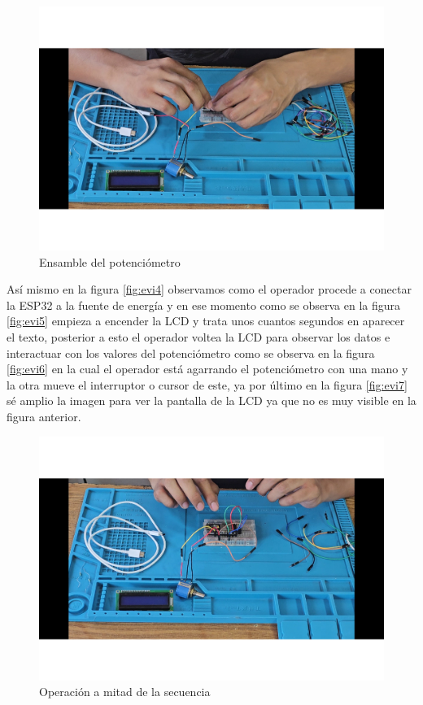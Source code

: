     \begin{figure}[H]
        \centering
        \includegraphics[trim = {25mm 25mm 25mm 10mm},clip,scale=0.3]{22/Img/e2.pdf}
        \caption{Ensamble del potenciómetro}
        \label{fig:evi1}
    \end{figure}
    
    
    
     Así mismo en la figura \ref{fig:evi4} observamos como el operador procede a conectar la ESP32 a la fuente de energía y en ese momento como se observa en la figura \ref{fig:evi5} empieza a encender la LCD y trata unos cuantos segundos en aparecer el texto, posterior a esto el operador voltea la LCD para observar los datos e interactuar con los valores del potenciómetro como se observa en la figura \ref{fig:evi6} en la cual el operador está agarrando el potenciómetro con una mano y la otra mueve el interruptor o cursor de este, ya por último en la figura \ref{fig:evi7} sé amplio la imagen para ver la pantalla de la LCD  ya que no es muy visible en la figura anterior.
    
     \begin{figure}[H]
        \centering
        \includegraphics[trim =  {25mm 25mm 25mm 10mm},clip,scale=0.3]{22/Img/e5.pdf}
        \caption{Operación a mitad de la secuencia}
        \label{fig:evi2}
    \end{figure}
    
